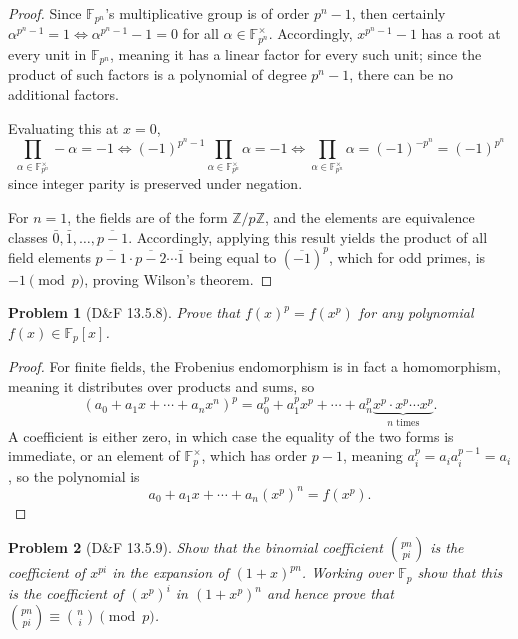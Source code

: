 \documentclass{article}
\newtheorem{plm}{Problem}
\begin{document}
\begin{proof}
  Since $\mathbb{F}_{p^n}$'s multiplicative group is of order $p^n-1$, then certainly $\alpha^{p^n - 1} = 1 \Leftrightarrow \alpha^{p^n - 1} - 1 = 0$
  for all $\alpha \in \mathbb{F}_{p^{n}}^{\times}$.
  Accordingly, $x^{p^{n} - 1} - 1$ has a root at every unit in $\mathbb{F}_{p^{n}}$, meaning it has a linear factor for every such unit;
  since the product of such factors is a polynomial of degree ${p^{n} - 1}$, there can be no additional factors.

  Evaluating this at $x = 0$,
  \[
    \prod_{\alpha \in \mathbb{F}_{p^{n}}^{\times}} -\alpha = -1 \Leftrightarrow (-1)^{p^{n} - 1} \prod_{\alpha \in \mathbb{F}_{p^{n}}^{\times}} \alpha = -1
    \Leftrightarrow
    \prod_{\alpha \in \mathbb{F}_{p^{n}}^{\times}} \alpha = (-1)^{-p^{n}} = (-1)^{p^{n}}
  \]
  since integer parity is preserved under negation.

  For $n = 1$, the fields are of the form $\mathbb{Z} / p\mathbb{Z}$, and the elements are equivalence classes $\bar{0}, \bar{1}, \ldots,
  \overline{p - 1}$.
  Accordingly, applying this result yields the product of all field elements $\overline{p - 1} \cdot \overline{p - 2} \cdots \bar{1}$
  being equal to $(\overline{-1})^{p}$, which for odd primes, is $-1 \pmod p$, proving Wilson's theorem.
\end{proof}

\begin{plm}[D\&F 13.5.8]
  Prove that $f(x)^{p} = f(x^{p})$ for any polynomial $f(x) \in \mathbb{F}_{p}[x]$.
\end{plm}

\begin{proof}
  For finite fields, the Frobenius endomorphism is in fact a homomorphism, meaning it distributes over products and sums, so
  \[
    (a_{0} + a_{1}x + \cdots + a_{n}x^{n})^{p} = a_{0}^{p} + a_{1}^{p}x^{p} + \cdots + a_{n}^{p}\underbrace{x^{p} \cdot x^{p} \cdots x^p}_{n\text{ times}}.
  \]
  A coefficient is either zero, in which case the equality of the two forms is immediate, or an element of $\mathbb{F}_{p}^{\times}$,
  which has order $p - 1$, meaning $a_{i}^{p} = a_{i}a_{i}^{p - 1} = a_{i}$, so the polynomial is
  \[
    a_{0} + a_{1}x + \cdots + a_{n}(x^{p})^{n} = f(x^{p}).
  \]

\end{proof}

\begin{plm}[D\&F 13.5.9]
  Show that the binomial coefficient $\binom{pn}{pi}$ is the coefficient of $x^{pi}$ in the expansion of $(1 + x)^{pn}$.
  Working over $\mathbb{F}_{p}$ show that this is the coefficient of $(x^{p})^{i}$ in $(1 + x^{p})^{n}$ and hence prove that
  $\binom{pn}{pi} \equiv \binom{n}{i} \pmod p$.
\end{plm}
\end{document}
